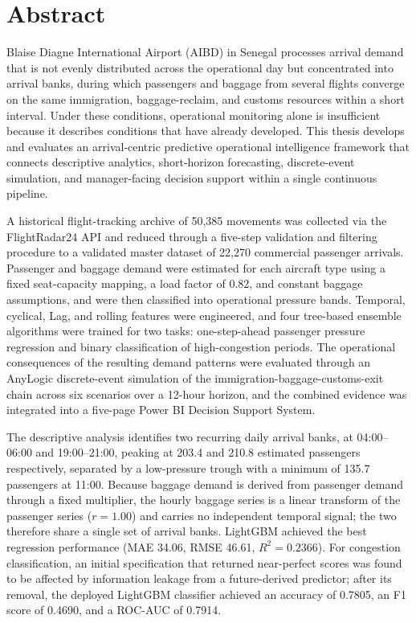 \chapter*{Abstract}

Blaise Diagne International Airport (AIBD) in Senegal processes arrival demand that is not evenly distributed across the operational day but concentrated into arrival banks, during which passengers and baggage from several flights converge on the same immigration, baggage-reclaim, and customs resources within a short interval. Under these conditions, operational monitoring alone is insufficient because it describes conditions that have already developed. This thesis develops and evaluates an arrival-centric predictive operational intelligence framework that connects descriptive analytics, short-horizon forecasting, discrete-event simulation, and manager-facing decision support within a single continuous pipeline.

A historical flight-tracking archive of 50,385 movements was collected via the FlightRadar24 API and reduced through a five-step validation and filtering procedure to a validated master dataset of 22,270 commercial passenger arrivals. Passenger and baggage demand were estimated for each aircraft type using a fixed seat-capacity mapping, a load factor of 0.82, and constant baggage assumptions, and were then classified into operational pressure bands. Temporal, cyclical, Lag, and rolling features were engineered, and four tree-based ensemble algorithms were trained for two tasks: one-step-ahead passenger pressure regression and binary classification of high-congestion periods. The operational consequences of the resulting demand patterns were evaluated through an AnyLogic discrete-event simulation of the immigration-baggage-customs-exit chain across six scenarios over a 12-hour horizon, and the combined evidence was integrated into a five-page Power BI Decision Support System.

The descriptive analysis identifies two recurring daily arrival banks, at 04:00--06:00 and 19:00--21:00, peaking at 203.4 and 210.8 estimated passengers respectively, separated by a low-pressure trough with a minimum of 135.7 passengers at 11:00. Because baggage demand is derived from passenger demand through a fixed multiplier, the hourly baggage series is a linear transform of the passenger series ($r = 1.00$) and carries no independent temporal signal; the two therefore share a single set of arrival banks. LightGBM achieved the best regression performance (MAE 34.06, RMSE 46.61, $R^2 = 0.2366$). For congestion classification, an initial specification that returned near-perfect scores was found to be affected by information leakage from a future-derived predictor; after its removal, the deployed LightGBM classifier achieved an accuracy of 0.7805, an F1 score of 0.4690, and a ROC-AUC of 0.7914.

